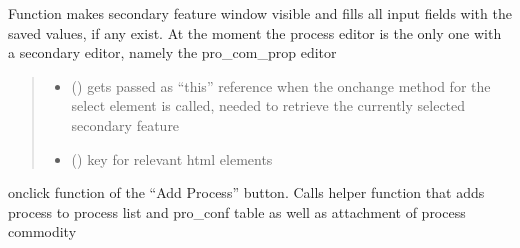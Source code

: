 \documentclass[letterpaper,10pt,english]{sphinxmanual}
\begin{document}
\begin{fulllineitems}
\label{\detokenize{docs_gui/js_api/urbs_editor/process_editor:openSecondaryProcessEditor}}
\pysigstartsignatures
{}
\pysigstopsignatures
\sphinxAtStartPar
Function makes secondary feature window visible and fills all input fields with the saved values, if any exist.
At the moment the process editor is the only one with a secondary editor, namely the pro\_com\_prop editor
\begin{quote}\begin{description}
\begin{itemize}
\item {} 
\sphinxAtStartPar
{} () \textendash{} gets passed as “this” reference when the onchange method for the select element is called, needed to retrieve the currently selected secondary feature

\item {} 
\sphinxAtStartPar
{} () \textendash{} key for relevant html elements

\end{itemize}

\end{description}\end{quote}

\end{fulllineitems}


\begin{fulllineitems}
\label{\detokenize{docs_gui/js_api/urbs_editor/process_editor:createNewProcess}}
\pysigstartsignatures
{}
\pysigstopsignatures
\sphinxAtStartPar
onclick function of the “Add Process” button. Calls helper function that adds process to process list and pro\_conf table
as well as attachment of process commodity

\end{fulllineitems}

\end{document}
